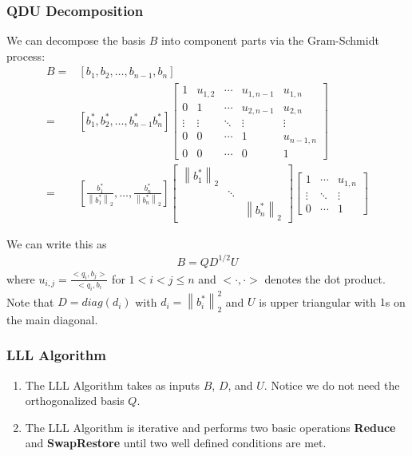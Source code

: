 \documentclass{beamer}
\newcommand{\norm}[1]{\left\lVert#1\right\rVert}
\begin{document}
\begin{frame}
\frametitle{QDU Decomposition}
We can decompose the basis $B$ into component parts via the Gram-Schmidt process:
\begin{align*}
B=&\left[b_1,b_2,\ldots,b_{n-1},b_n\right]\\
 =&\left[b^*_1,b^*_2,\ldots,b^*_{n-1}b^*_n\right]
	\left[ \begin{array}{ccccc}
		1 & u_{1,2} & \cdots & u_{1,n-1} & u_{1,n} \\
		0 & 1       & \cdots & u_{2,n-1} & u_{2,n} \\
		\vdots & \vdots & \ddots & \vdots & \vdots \\
		0 & 0       & \cdots & 1 & u_{n-1,n}       \\
		0 & 0       & \cdots & 0 & 1               
	\end{array}\right]\\
 =&\left[\frac{b^*_1}{\norm{b^*_1}_2},\ldots,\frac{b^*_n}{\norm{b^*_n}_2}\right]
   \left[\begin{array}{ccc}
		\norm{b^*_1}_2  &  \\
		&  \ddots       &  \\
		&      &\norm{b^*_n}_2 
   \end{array}\right]
   \left[\begin{array}{ccc}
		1 & \cdots & u_{1,n} \\
		\vdots & \ddots & \vdots \\
		0 & \cdots & 1
   \end{array}\right]
\end{align*}
\end{frame}
\begin{frame}
We can write this as
\begin{eqnarray}
B=QD^{1/2}U\label{decomp}
\end{eqnarray}
where $u_{i,j}=\frac{<q_i,b_j>}{<q_i,b_i}$ for $1 < i < j \leq n$ and $<\cdot,\cdot>$ denotes the dot product. Note that $D=diag(d_i)$ with $d_i=\norm{b^*_i}^2_2$ and $U$ is upper triangular with $1$s on the main diagonal.
\end{frame}

\begin{frame}
\frametitle{LLL Algorithm}
\begin{enumerate}
\item The LLL Algorithm takes as inputs $B$, $D$, and $U$. Notice we do not need the orthogonalized basis $Q$.
\item The LLL Algorithm is iterative and performs two basic operations \textbf{Reduce} and \textbf{SwapRestore} until two well defined conditions are met.
\end{enumerate}
\end{frame}
\end{document}

